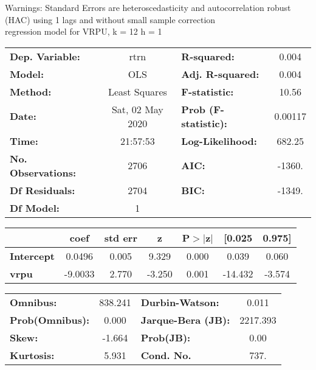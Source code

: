Warnings: \newline
 [1] Standard Errors are heteroscedasticity and autocorrelation robust (HAC) using 1 lags and without small sample correction\\ 

regression model for VRPU, k = 12 h = 1\begin{center}
\begin{tabular}{lclc}
\toprule
\textbf{Dep. Variable:}    &       rtrn       & \textbf{  R-squared:         } &     0.004   \\
\textbf{Model:}            &       OLS        & \textbf{  Adj. R-squared:    } &     0.004   \\
\textbf{Method:}           &  Least Squares   & \textbf{  F-statistic:       } &     10.56   \\
\textbf{Date:}             & Sat, 02 May 2020 & \textbf{  Prob (F-statistic):} &  0.00117    \\
\textbf{Time:}             &     21:57:53     & \textbf{  Log-Likelihood:    } &    682.25   \\
\textbf{No. Observations:} &        2706      & \textbf{  AIC:               } &    -1360.   \\
\textbf{Df Residuals:}     &        2704      & \textbf{  BIC:               } &    -1349.   \\
\textbf{Df Model:}         &           1      & \textbf{                     } &             \\
\bottomrule
\end{tabular}
\begin{tabular}{lcccccc}
                   & \textbf{coef} & \textbf{std err} & \textbf{z} & \textbf{P$> |$z$|$} & \textbf{[0.025} & \textbf{0.975]}  \\
\midrule
\textbf{Intercept} &       0.0496  &        0.005     &     9.329  &         0.000        &        0.039    &        0.060     \\
\textbf{vrpu}      &      -9.0033  &        2.770     &    -3.250  &         0.001        &      -14.432    &       -3.574     \\
\bottomrule
\end{tabular}
\begin{tabular}{lclc}
\textbf{Omnibus:}       & 838.241 & \textbf{  Durbin-Watson:     } &    0.011  \\
\textbf{Prob(Omnibus):} &   0.000 & \textbf{  Jarque-Bera (JB):  } & 2217.393  \\
\textbf{Skew:}          &  -1.664 & \textbf{  Prob(JB):          } &     0.00  \\
\textbf{Kurtosis:}      &   5.931 & \textbf{  Cond. No.          } &     737.  \\
\bottomrule
\end{tabular}
\end{center}

